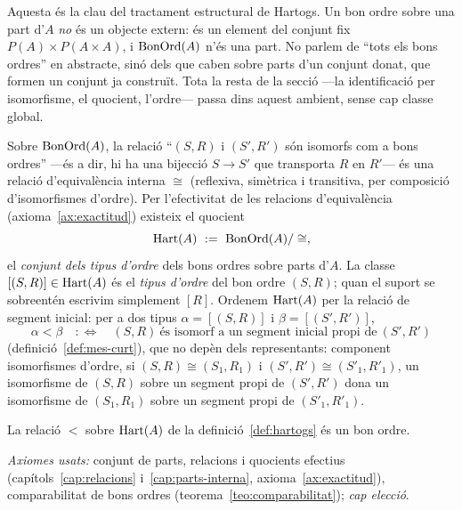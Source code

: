 \begin{observacio}\label{obs:hartogs-acotat}
Aquesta és la clau del tractament estructural de Hartogs. Un bon ordre sobre
una part d'\(A\) \emph{no} és un objecte extern: és un element del conjunt fix
\(P(A)\times P(A\times A)\), i \(\operatorname{BonOrd}(A)\) n'és una part. No parlem de
\enquote{tots els bons ordres} en abstracte, sinó dels que caben sobre parts
d'un conjunt donat, que formen un conjunt ja construït. Tota la resta de la
secció ---la identificació per isomorfisme, el quocient, l'ordre--- passa dins
aquest ambient, sense cap classe global.
\end{observacio}

\begin{definicio}\label{def:hartogs}
Sobre \(\operatorname{BonOrd}(A)\), la relació \enquote{\((S,R)\) i \((S',R')\) són isomorfs com
a bons ordres} ---és a dir, hi ha una bijecció \(S\to S'\) que transporta
\(R\) en \(R'\)--- és una relació d'equivalència interna \(\cong\) (reflexiva,
simètrica i transitiva, per composició d'isomorfismes d'ordre). Per
l'efectivitat de les relacions d'equivalència (axioma~\ref{ax:exactitud})
existeix el quocient
\[
\operatorname{Hart}(A)\ :=\ \operatorname{BonOrd}(A)/\cong,
\]
el \emph{conjunt dels tipus d'ordre} dels bons ordres sobre parts d'\(A\). La
classe \([(S,R)]\in\operatorname{Hart}(A)\) és el \emph{tipus d'ordre} del bon ordre
\((S,R)\); quan el suport se sobreentén escrivim simplement \([R]\).
Ordenem \(\operatorname{Hart}(A)\) per la relació de segment inicial: per a dos tipus
\(\alpha=[(S,R)]\) i \(\beta=[(S',R')]\),
\[
\alpha<\beta
\quad:\Longleftrightarrow\quad
(S,R)\ \text{és isomorf a un segment inicial propi de}\ (S',R')
\]
(definició~\ref{def:mes-curt}), que no depèn dels representants:
component isomorfismes d'ordre, si \((S,R)\cong(S_1,R_1)\) i
\((S',R')\cong(S'_1,R'_1)\), un isomorfisme de \((S,R)\) sobre un segment
propi de \((S',R')\) dona un isomorfisme de \((S_1,R_1)\) sobre un segment
propi de \((S'_1,R'_1)\).
\end{definicio}

\begin{proposicio}\label{prop:hartogs-bon-ordre}
La relació \(<\) sobre \(\operatorname{Hart}(A)\) de la definició~\ref{def:hartogs} és un
bon ordre.\par
\emph{Axiomes usats:} conjunt de parts, relacions i quocients efectius
(capítols~\ref{cap:relacions} i~\ref{cap:parts-interna},
axioma~\ref{ax:exactitud}), comparabilitat de bons ordres
(teorema~\ref{teo:comparabilitat}); \emph{cap elecció}.
\end{proposicio}

